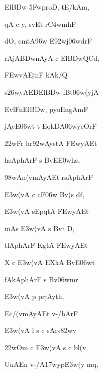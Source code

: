 \dnnemslokad 
{\dn El\3BDw\? \35FwproD, tE/kAm, \vegdn\dontdisplaylinenum}


\ujvers\dnnemsloka 
{\dn {}qA\2 c y, s\?vEt r\3C4wm\?hF}
\dontdisplaylinenum

\dnnemslokab 
{\dn dO, cm\0tA\396w E\392wj\306wdrF \dandadn\dontdisplaylinenum}

\dnnemslokac 
{\dn rAjA\3BDwnAyA c El\3BDwQC\?d,}
\dontdisplaylinenum

\dnnemslokad 
{\dn \3FEwv\5AEjnF kAk/Q \vegdn\dontdisplaylinenum}


\ujvers\dnnemsloka 
{\dn s\326wyAEDEl\3BDw lBt\?\306w(yjA}
\dontdisplaylinenum

\dnnemslokab 
{\dn EvlFnEl\3BDw, pyoEngAmF \dandadn\dontdisplaylinenum}

\dnnemslokac 
{\dn jAyE\306wt t\? EqkDA\306wycOrF}
\dontdisplaylinenum

\dnnemslokad 
{\dn \322wFr\2 hr\?\392wAystA\2 \3FEwyAEt \vegdn\dontdisplaylinenum}


\ujvers\dnnemsloka 
{\dn h\2sAphArF s Bv\?E\3E0wh\2s,}
\dontdisplaylinenum

\dnnemslokab 
{\dn \398wAn(vmAyAEt rsAphArF \dandadn\dontdisplaylinenum}

\dnnemslokac 
{\dn \3E3w(vA c cF\306w Bv\?(s d\2f,}
\dontdisplaylinenum

\dnnemslokad 
{\dn \3E3w(vA  sEp\0\0qtA\2 \3FEwyAEt \vegdn\dontdisplaylinenum}


\ujvers\dnnemsloka 
{\dn mA\2s\2  \3E3w(vA s Bv\?t D\5,}
\dontdisplaylinenum

\dnnemslokab 
{\dn t\4lAphArF KgtA\2 \3FEwyAEt \dandadn\dontdisplaylinenum}

\dnnemslokac 
{\dn {}X\2 c \3E3w(vA EXkA BvE\306wt}
\dontdisplaylinenum

\dnnemslokad 
{\dn fAkAphArF s Bv\?\306wmr \vegdn\dontdisplaylinenum}


\ujvers\dnnemsloka 
{\dn \3E3w(vA p\2 prjAyt\?h,}
\dontdisplaylinenum

\dnnemslokab 
{\dn Ec/(vmAyAEt v-/hArF \dandadn\dontdisplaylinenum}

\dnnemslokac 
{\dn \3E3w(vA l\2 s c sArs\382wv\2}
\dontdisplaylinenum

\dnnemslokad 
{\dn \322wOm\2 c \3E3w(vA s c b\0l(v \vegdn\dontdisplaylinenum}


\ujvers\dnnemsloka 
{\dn UnA\0En v-/A\317wyp\3E3w(y m\?q,}
\dontdisplaylinenum

